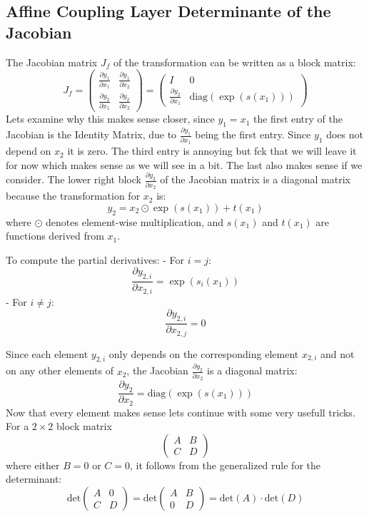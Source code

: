 \documentclass[a4paper]{article}
\begin{document}
\subsection{Affine Coupling Layer Determinante of the Jacobian}
The Jacobian matrix \(J_f\) of the transformation can be written as a block matrix:
\[
J_f = 
\begin{pmatrix}
\frac{\partial y_1}{\partial x_1} & \frac{\partial y_1}{\partial x_2} \\
\frac{\partial y_2}{\partial x_1} & \frac{\partial y_2}{\partial x_2}
\end{pmatrix}
=
\begin{pmatrix}
I & 0 \\
\frac{\partial y_2}{\partial x_1} & \text{diag}(\exp(s(x_1)))
\end{pmatrix}
\]
Lets examine why this makes sense closer, since $y_1 = x_1$ the first entry of the Jacobian is the Identity Matrix, due to $\frac{\partial y_1}{\partial x_1}$ being the first entry. Since $y_1$ does not depend on $x_2$ it is zero. The third entry is annoying but fck that we will leave it for now which makes sense as we will see in a bit. The last also makes sense if we consider. 
The lower right block \(\frac{\partial y_2}{\partial x_2}\) of the Jacobian matrix is a diagonal matrix because the transformation for \(x_2\) is:
\[
y_2 = x_2 \odot \exp(s(x_1)) + t(x_1)
\]
where \(\odot\) denotes element-wise multiplication, and \(s(x_1)\) and \(t(x_1)\) are functions derived from \(x_1\).

To compute the partial derivatives:
- For \(i = j\):
  \[
  \frac{\partial y_{2,i}}{\partial x_{2,i}} = \exp(s_i(x_1))
  \]
- For \(i \neq j\):
  \[
  \frac{\partial y_{2,i}}{\partial x_{2,j}} = 0
  \]

Since each element \(y_{2,i}\) only depends on the corresponding element \(x_{2,i}\) and not on any other elements of \(x_2\), the Jacobian \(\frac{\partial y_2}{\partial x_2}\) is a diagonal matrix:
\[
\frac{\partial y_2}{\partial x_2} = \text{diag}(\exp(s(x_1)))
\]
Now that every element makes sense lets continue with some very usefull tricks.
For a \(2 \times 2\) block matrix 
\[
\begin{pmatrix}
A & B \\
C & D
\end{pmatrix}
\]
where either \( B = 0 \) or \( C = 0 \), it follows from the generalized rule for the determinant:
\[
\text{det} \begin{pmatrix}
A & 0 \\
C & D
\end{pmatrix}
= \text{det} \begin{pmatrix}
A & B \\
0 & D
\end{pmatrix}
= \text{det}(A) \cdot \text{det}(D)
\]
\end{document}
